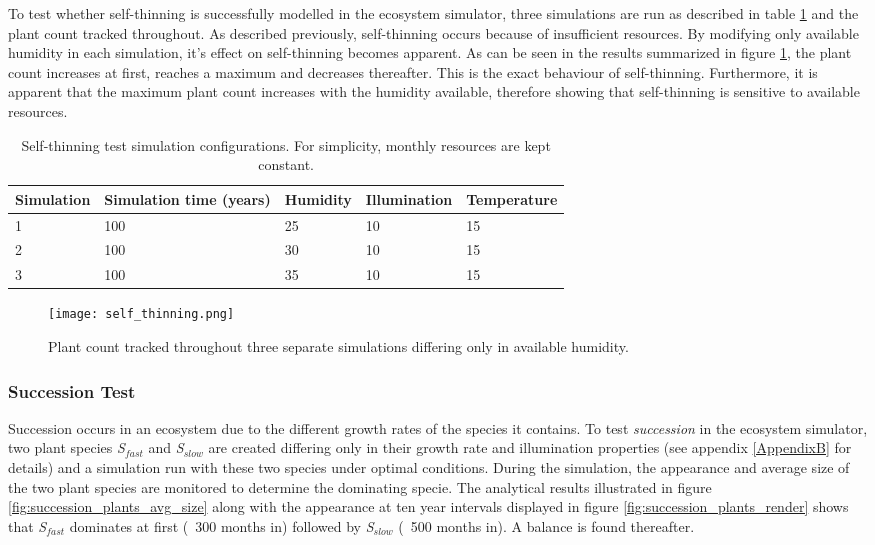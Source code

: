 To test whether self-thinning is successfully modelled in the ecosystem simulator, three simulations are run as described in table \ref{tab:self_thinning_test_simulations} and the plant count tracked throughout. As described previously, self-thinning occurs because of insufficient resources. By modifying only available humidity in each simulation, it's effect on self-thinning becomes apparent. As can be seen in the results summarized in figure \ref{fig:self_thinning_test_results}, the plant count increases at first, reaches a maximum and decreases thereafter. This is the exact behaviour of self-thinning. Furthermore, it is apparent that the maximum plant count increases with the humidity available, therefore showing that self-thinning is sensitive to available resources.

\begin{table}[]
  \centering
	    \begin{tabular}{|p{3cm}|p{3cm}|p{3cm}|p{3cm}|p{3cm}|}
		\hline
		\textbf{Simulation} & \textbf{Simulation time (years)} & \textbf{Humidity} & \textbf{Illumination} & \textbf{Temperature}\\
		\hline       
		1 & 100 & 25 & 10 & 15\\           
		\hline       
		2 & 100 & 30 & 10 & 15\\   
		\hline       
		3 & 100 & 35 & 10 & 15\\              
		\hline       
		\end{tabular}
		\caption{Self-thinning test simulation configurations. For simplicity, monthly resources are kept constant.}
		\label{tab:self_thinning_test_simulations}
\end{table}

\begin{figure}
\center
	\texttt{[image: self\_thinning.png]}
	\caption{ Plant count tracked throughout three separate simulations differing only in available humidity. }
	\label{fig:self_thinning_test_results}
\end{figure}

\subsubsection{Succession Test}

Succession occurs in an ecosystem due to the different growth rates of the species it contains. To test \textit{succession} in the ecosystem simulator, two plant species \textit{S$_{fast}$} and \textit{S$_{slow}$} are created differing only in their growth rate and illumination properties (see appendix \ref{AppendixB} for details) and a simulation run with these two species under optimal conditions. During the simulation, the appearance and average size of the two plant species are monitored to determine the dominating specie. The analytical results illustrated in figure \ref{fig:succession_plants_avg_size} along with the appearance at ten year intervals displayed in figure \ref{fig:succession_plants_render} shows that \textit{S$_{fast}$} dominates at first (~300 months in) followed by \textit{S$_{slow}$} (~500 months in). A balance is found thereafter.

